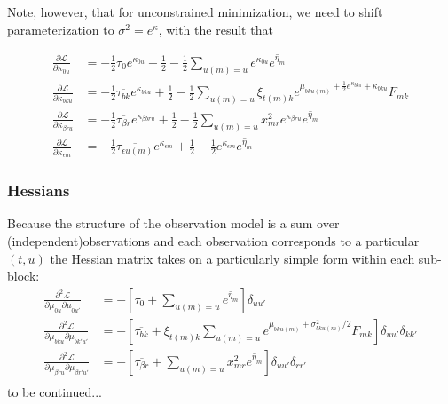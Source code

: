\documentclass[11pt]{article}
\begin{document}
Note, however, that for unconstrained minimization, we need to shift parameterization to $\sigma^2 = e^\kappa$, with the result that

\begin{align}
    \frac{\partial\mathcal{L}}{\partial \kappa_{0u}} &= -\frac{1}{2}\tau_0 e^{\kappa_{0u}} + \frac{1}{2} - \frac{1}{2} \sum_{u(m) = u} e^{\kappa_{0u}} \overline{e^{\eta_m}} \\
    \frac{\partial\mathcal{L}}{\partial \kappa_{bku}} &=
    - \frac{1}{2} \overline{\tau_{bk}} e^{\kappa_{bku}} + \frac{1}{2} - \frac{1}{2}\sum_{u(m) = u} \xi_{t(m)k} e^{\mu_{bku(m)} + \frac{1}{2} e^{\kappa_{bku}} + \kappa_{bku}} F_{mk}  \\
    \frac{\partial\mathcal{L}}{\partial \kappa_{\beta ru}} &=
    - \frac{1}{2} \overline{\tau_{\beta r}} e^{\kappa_{\beta bru}} +
    \frac{1}{2} - \frac{1}{2} \sum_{u(m) = u} x^2_{mr} e^{\kappa_{\beta ru}} \overline{e^{\eta_m}} \\
    \frac{\partial\mathcal{L}}{\partial \kappa_{\epsilon m}} &=
    -\frac{1}{2} \overline{\tau_{\epsilon u(m)}} e^{\kappa_{\epsilon m}} + \frac{1}{2} - \frac{1}{2} e^{\kappa_{\epsilon m}} \overline{e^{\eta_m}}
\end{align}

\subsubsection{Hessians}
Because the structure of the observation model is a sum over (independent)observations and each observation corresponds to a particular $(t, u)$ the Hessian matrix takes on a particularly simple form within each sub-block:
\begin{align}
    \frac{\partial^2\mathcal{L}}{\partial \mu_{0u}\partial \mu_{0u'}} &=
    -\left[\tau_0 + \sum_{u(m)=u} \overline{e^{\eta_m}}\right]\delta_{uu'} \\
    \frac{\partial^2\mathcal{L}}{\partial \mu_{bku}\partial \mu_{bk'u'}} &=
    -\left[\overline{\tau_{bk}} + \xi_{t(m) k}\sum_{u(m) = u} e^{\mu_{bku(m)} + \sigma^2_{bku(m)} / 2} F_{mk} \right]\delta_{uu'} \delta_{k k'} \\
    \frac{\partial^2\mathcal{L}}{\partial \mu_{\beta ru}\partial \mu_{\beta r'u'}} &=
    -\left[\overline{\tau_{\beta r}} + \sum_{u(m) = u} x^2_{mr} \overline{e^{\eta_m}} \right]\delta_{uu'} \delta_{r r'} \\
\end{align}
to be continued...
\end{document}
